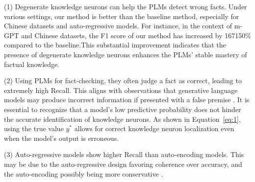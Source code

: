 \documentclass[]{article}
\begin{document}
(1) Degenerate knowledge neurons can help the PLMs detect wrong facts. Under various settings, our method is better than the baseline method, especially for Chinese datasets and auto-regressive models. For instance, in the context of m-GPT and Chinese datasets, the F1 score of our method has increased by 167150\% compared to the baseline.This substantial improvement indicates that the presence of degenerate knowledge neurons enhances the PLMs' stable mastery of factual knowledge.

(2) Using PLMs for fact-checking, they often judge a fact as correct, leading to extremely high Recall. This aligns with observations that generative language models may produce incorrect information if presented with a false premise \cite{hallucination_chatgpt3, lakshmanan2022large, metz2022new}.
It is essential to recognize that a model's low predictive probability does not hinder the accurate identification of knowledge neurons. As shown in Equation~\ref{eq:1}, using the true value \( y^* \) allows for correct knowledge neuron localization even when the model's output is erroneous.


(3) Auto-regressive models show higher Recall than auto-encoding models. This may be due to the auto-regressive design favoring coherence over accuracy, and the auto-encoding possibly being more conservative  \cite{zhou2023comprehensive}.
\end{document}
